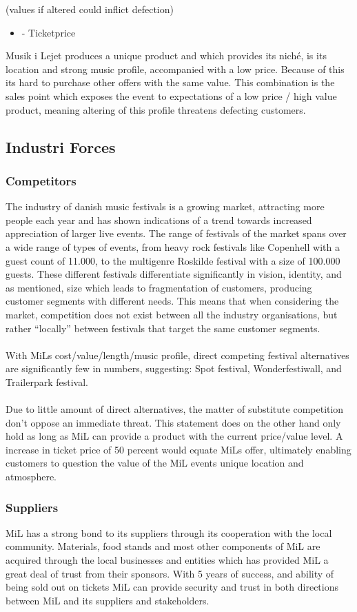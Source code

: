 (values if altered could inflict defection)
\begin{itemize}
	\item - Ticketprice
\end{itemize}

Musik i Lejet produces a unique product and which provides its niché, is its location and strong music profile, accompanied with a low price. Because of this its hard to purchase other offers with the same value. This combination is the sales point which exposes the event to expectations of a low price / high value product, meaning altering of this profile threatens defecting customers. 

\subsection{Industri Forces}
\subsubsection{Competitors}

The industry of danish music festivals is a growing market, attracting more people each year and has shown indications of a trend towards increased appreciation of larger live events. The range of festivals of the market spans over a wide range of types of events, from heavy rock festivals like Copenhell with a guest count of 11.000, to the multigenre Roskilde festival with a size of 100.000 guests. These different festivals differentiate significantly in vision, identity, and as mentioned, size which leads to fragmentation of customers, producing customer segments with different needs. This means that when considering the market, competition does not exist between all the industry organisations, but rather “locally” between festivals that target the same customer segments. 
\\ \\
With MiLs cost/value/length/music profile, direct competing festival alternatives are significantly few in numbers, suggesting: Spot festival, Wonderfestiwall, and Trailerpark festival. 
\\ \\
Due to little amount of direct alternatives, the matter of substitute competition don’t oppose an immediate threat. This statement does on the other hand only hold as long as MiL can provide a product with the current price/value level. A increase in ticket price of 50 percent would equate MiLs offer, ultimately enabling customers to question the value of the MiL events unique location and atmosphere.

\subsubsection{Suppliers}
MiL has a strong bond to its suppliers through its cooperation with the local community. Materials, food stands and most other components of MiL are acquired through the local businesses and entities which has provided MiL a great deal of trust from their sponsors. With 5 years of success, and ability of being sold out on tickets MiL can provide security and trust in both directions between MiL and its suppliers and stakeholders.